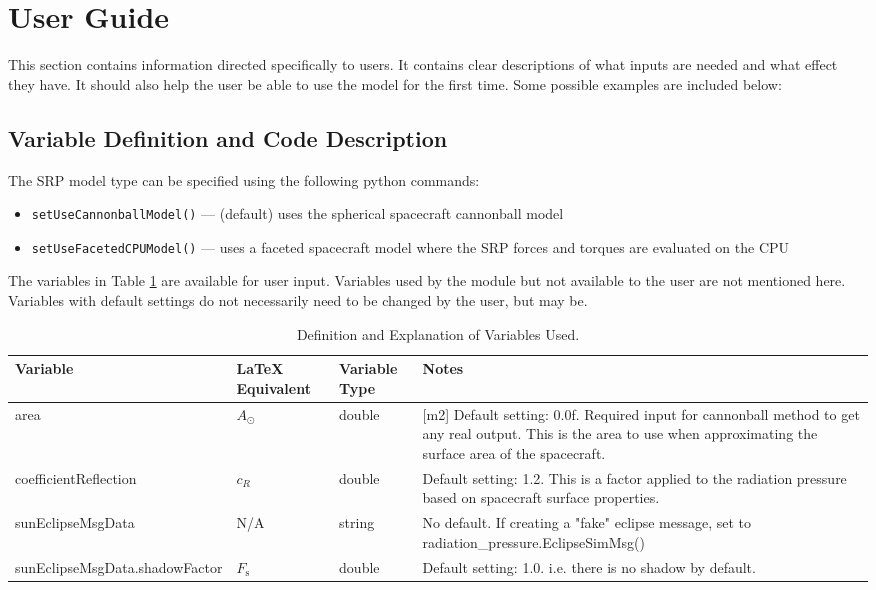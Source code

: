\section{User Guide}
This section contains information directed specifically to users. It contains clear descriptions of what inputs are needed and what effect they have. It should also help the user be able to use the model for the first time. Some possible examples are included below:

\subsection{Variable Definition and Code Description}
The SRP model type can be specified using the following python commands:
\begin{itemize}
	\item {\tt setUseCannonballModel()} --- (default) uses the spherical spacecraft cannonball model
	\item {\tt setUseFacetedCPUModel()}  --- uses a faceted spacecraft model where the SRP forces and torques are evaluated on the CPU
\end{itemize}

The variables in Table \ref{tabular:vars} are available for user input. Variables used by the module but not available to the user are not mentioned here. Variables with default settings do not necessarily need to be changed by the user, but may be.
\begin{table}[H]
	\caption{Definition and Explanation of Variables Used.}
	\centering \fontsize{10}{10}\selectfont
	\begin{tabular}{ | m{5cm}| m{2cm} | m{1.5cm} | m{6cm} |} %
		\hline
		\textbf{Variable}   		& \textbf{LaTeX Equivalent} 	                  &		\textbf{Variable Type}   & \textbf{Notes} \\ \hline
		area 						  	  & $A_{\odot}$							  & double 								& [m2] Default setting: 0.0f. Required input for cannonball method to get any real output. This is the area to use when approximating the surface area of the spacecraft.\\ \hline
		coefficientReflection 	  & $c_{R}$ 								& double 								& Default setting: 1.2. This is a factor applied to the radiation pressure based on spacecraft surface properties.\\ \hline
		sunEclipseMsgData		& N/A										& string									& No default. If creating a "fake" eclipse message, set to radiation\_pressure.EclipseSimMsg() \\ \hline
		sunEclipseMsgData.shadowFactor & $F_{\mathrm{s}}$& double								& Default setting: 1.0. i.e. there is no shadow by default. \\ \hline
	\end{tabular}
	\label{tabular:vars}
\end{table}


